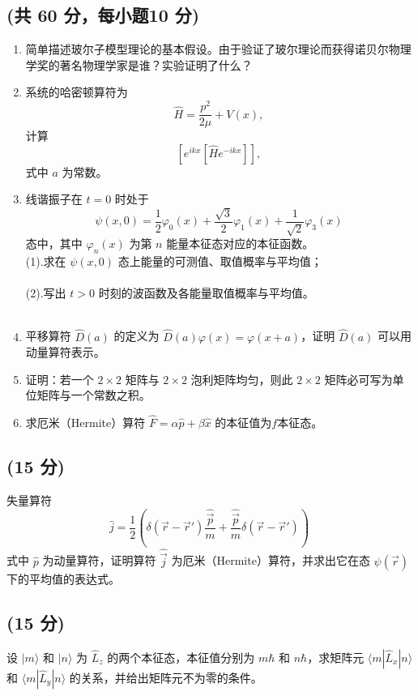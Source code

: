 
\subsection{(共 60 分，每小题10 分)}
\begin{enumerate}
\item 简单描述玻尔子模型理论的基本假设。由于验证了玻尔理论而获得诺贝尔物理学奖的著名物理学家是谁？实验证明了什么？

\item 系统的哈密顿算符为 
$$\hat{H} = \frac{p^2}{2\mu} + V(x),~$$
计算
$$\left[e^{ikx}[\hat{H}e^{-ikx}]\right],~$$
式中 $a$ 为常数。

\item 线谐振子在 $t = 0$ 时处于
$$ \psi(x, 0) = \frac{1}{2}\varphi_0(x) + \frac{\sqrt{3}}{2}\varphi_1(x) + \frac{1}{\sqrt{2}}\varphi_3(x)~ $$
态中，其中 $\varphi_n(x)$ 为第 $n$ 能量本征态对应的本征函数。\\
(1).求在 $\psi(x, 0)$ 态上能量的可测值、取值概率与平均值；\\\\
(2).写出 $t > 0$ 时刻的波函数及各能量取值概率与平均值。\\\\
\item 平移算符 $\hat{D}(a)$ 的定义为 $\hat{D}(a)\varphi(x) = \varphi(x + a)$，证明 $\hat{D}(a)$ 可以用动量算符表示。

\item 证明：若一个 $2 \times 2$ 矩阵与 $2 \times 2$ 泡利矩阵均匀，则此 $2 \times 2$ 矩阵必可写为单位矩阵与一个常数之积。

\item 求厄米（Hermite）算符 $\hat{F} = \alpha\hat{p} + \beta\hat{x}$ 的本征值为$f$本征态。
\end{enumerate}
\subsection{(15 分)}
失量算符
\[
\hat{j} = \frac{1}{2} \left( \delta(\vec{r} - \vec{r}') \frac{\hat{\vec{p}}}{m} + \frac{\hat{\vec{p}}}{m} \delta(\vec{r} - \vec{r}') \right)~
\]
式中 $\hat{p}$ 为动量算符，证明算符 $\hat{\vec{j}}$ 为厄米（Hermite）算符，并求出它在态 $\psi(\vec{r})$ 下的平均值的表达式。

\subsection{(15 分)}
设 $|m\rangle$ 和 $|n\rangle$ 为 $\hat{L}_z$ 的两个本征态，本征值分别为 $m\hbar$ 和 $n\hbar$，求矩阵元 $\langle m| \hat{L}_x |n \rangle$ 和 $\langle m| \hat{L}_y |n \rangle$ 的关系，并给出矩阵元不为零的条件。
